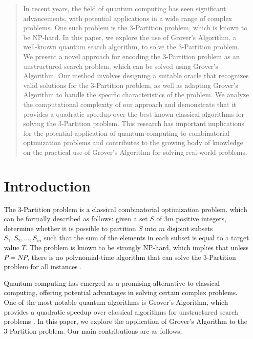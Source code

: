 \begin{abstract}
In recent years, the field of quantum computing has seen significant advancements, with potential applications in a wide range of complex problems. One such problem is the 3-Partition problem, which is known to be NP-hard. In this paper, we explore the use of Grover's Algorithm, a well-known quantum search algorithm, to solve the 3-Partition problem. We present a novel approach for encoding the 3-Partition problem as an unstructured search problem, which can be solved using Grover's Algorithm. Our method involves designing a suitable oracle that recognizes valid solutions for the 3-Partition problem, as well as adapting Grover's Algorithm to handle the specific characteristics of the problem. We analyze the computational complexity of our approach and demonstrate that it provides a quadratic speedup over the best known classical algorithms for solving the 3-Partition problem. This research has important implications for the potential application of quantum computing to combinatorial optimization problems and contributes to the growing body of knowledge on the practical use of Grover's Algorithm for solving real-world problems.

\end{abstract}

\section{Introduction}

The 3-Partition problem is a classical combinatorial optimization problem, which can be formally described as follows: given a set $S$ of $3m$ positive integers, determine whether it is possible to partition $S$ into $m$ disjoint subsets $S_1, S_2, \ldots, S_m$ such that the sum of the elements in each subset is equal to a target value $T$. The problem is known to be strongly NP-hard, which implies that unless $P = NP$, there is no polynomial-time algorithm that can solve the 3-Partition problem for all instances \cite{garey1979computers}.

Quantum computing has emerged as a promising alternative to classical computing, offering potential advantages in solving certain complex problems. One of the most notable quantum algorithms is Grover's Algorithm, which provides a quadratic speedup over classical algorithms for unstructured search problems \cite{grover1996fast}. In this paper, we explore the application of Grover's Algorithm to the 3-Partition problem. Our main contributions are as follows:

